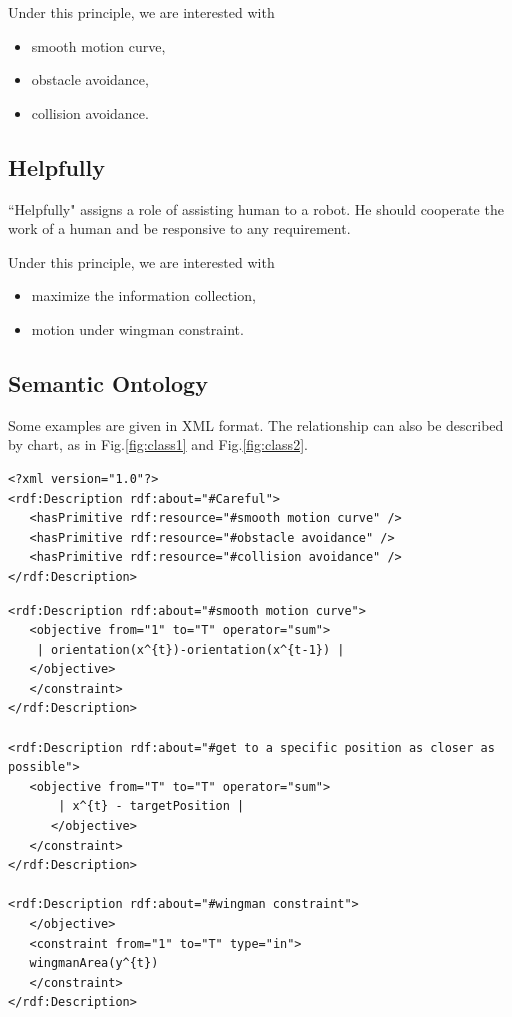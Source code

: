 \documentclass[12pt]{article}
\begin{document}
Under this principle, we are interested with

\begin{itemize}
  \item smooth motion curve,
  \item obstacle avoidance,
  \item collision avoidance.
\end{itemize}

\subsection{Helpfully}

``Helpfully" assigns a role of assisting human to a robot. He should cooperate the work of a human and be responsive to any requirement.

Under this principle, we are interested with

\begin{itemize}
  \item maximize the information collection,
  \item motion under wingman constraint.
\end{itemize}

\subsection{Semantic Ontology}

Some examples are given in XML format. The relationship can also be described by chart, as in Fig.\ref{fig:class1} and Fig.\ref{fig:class2}.

\lstset{language=XML}
\begin{lstlisting}
<?xml version="1.0"?>
<rdf:Description rdf:about="#Careful"> 
   <hasPrimitive rdf:resource="#smooth motion curve" /> 
   <hasPrimitive rdf:resource="#obstacle avoidance" /> 
   <hasPrimitive rdf:resource="#collision avoidance" />
</rdf:Description>
\end{lstlisting}

\begin{lstlisting}
<rdf:Description rdf:about="#smooth motion curve">
   <objective from="1" to="T" operator="sum">
    | orientation(x^{t})-orientation(x^{t-1}) |
   </objective>
   </constraint>
</rdf:Description>

<rdf:Description rdf:about="#get to a specific position as closer as possible">
   <objective from="T" to="T" operator="sum">
       | x^{t} - targetPosition |
      </objective>
   </constraint>
</rdf:Description>

<rdf:Description rdf:about="#wingman constraint">
   </objective>
   <constraint from="1" to="T" type="in">
   wingmanArea(y^{t})
   </constraint>
</rdf:Description>
\end{lstlisting}
\end{document}
